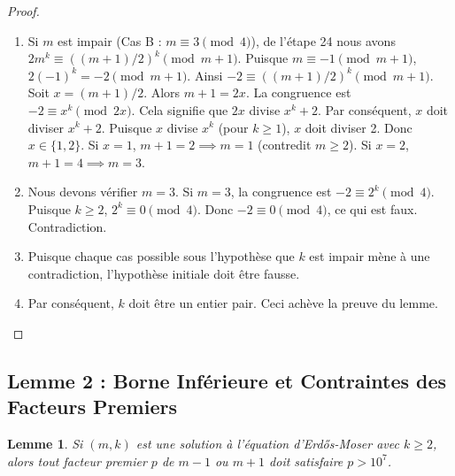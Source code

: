 \documentclass[11pt,a4paper]{article}
\newtheorem{lemma}{Lemme}
\begin{document}
\begin{proof}
\begin{enumerate}
    \item Si $m$ est impair (Cas B : $m \equiv 3 \pmod 4$), de l'étape 24 nous avons $2m^k \equiv ((m+1)/2)^k \pmod{m+1}$. Puisque $m \equiv -1 \pmod{m+1}$, $2(-1)^k = -2 \pmod{m+1}$. Ainsi $-2 \equiv ((m+1)/2)^k \pmod{m+1}$. Soit $x = (m+1)/2$. Alors $m+1 = 2x$. La congruence est $-2 \equiv x^k \pmod{2x}$. Cela signifie que $2x$ divise $x^k + 2$. Par conséquent, $x$ doit diviser $x^k + 2$. Puisque $x$ divise $x^k$ (pour $k \ge 1$), $x$ doit diviser 2. Donc $x \in \{1, 2\}$. Si $x=1$, $m+1=2 \implies m=1$ (contredit $m \ge 2$). Si $x=2$, $m+1=4 \implies m=3$.
    \item Nous devons vérifier $m=3$. Si $m=3$, la congruence est $-2 \equiv 2^k \pmod 4$. Puisque $k \ge 2$, $2^k \equiv 0 \pmod 4$. Donc $-2 \equiv 0 \pmod 4$, ce qui est faux. Contradiction.
    \item Puisque chaque cas possible sous l'hypothèse que $k$ est impair mène à une contradiction, l'hypothèse initiale doit être fausse.
    \item Par conséquent, $k$ doit être un entier pair. Ceci achève la preuve du lemme.
\end{enumerate}
\end{proof}

\subsection{Lemme 2 : Borne Inférieure et Contraintes des Facteurs Premiers}

\begin{lemma}
Si $(m, k)$ est une solution à l'équation d'Erd\H{o}s-Moser avec $k \ge 2$, alors tout facteur premier $p$ de $m-1$ ou $m+1$ doit satisfaire $p > 10^7$.
\end{lemma}
\end{document}

